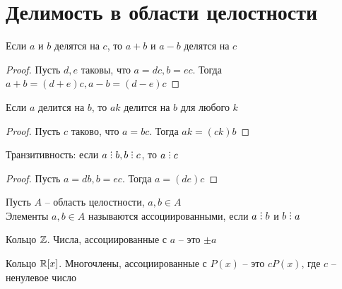 \section{Делимость в области целостности}

\begin{props}
	\item Если $a$ и $b$ делятся на $c$, то $a + b$ и $a - b$ делятся на $c$
	\begin{proof}
		Пусть $d, e$ таковы, что $a = dc, b = ec$. Тогда $a + b = (d + e)c, a - b = (d - e)c $
	\end{proof}
	\item Если $a$ делится на $b$, то $ak$ делится на $b$ для любого $k$
	\begin{proof}
		Пусть $c$ таково, что $a = bc$. Тогда $ak = (ck)b$
	\end{proof}
	\item Транзитивность: если $a \divby b, b \divby c$, то $a \divby c$
	\begin{proof}
		Пусть $a = db, b = ec$. Тогда $a = (de)c $
	\end{proof}
\end{props}

\begin{definition}
	Пусть $A$ -- область целостности, $a, b \in A$ \\
	Элементы $a, b \in A$ называются ассоциированными, если $a \divby b$ и $b \divby a$
\end{definition}

\begin{exmpls}
	\item Кольцо $\mathbb{Z}$. Числа, ассоциированные с $a$ -- это $\pm a$
	\item Кольцо $\mathbb{R}[x]$. Многочлены, ассоциированные с $P(x)$ -- это $cP(x)$, где $c$ -- ненулевое число
\end{exmpls}

